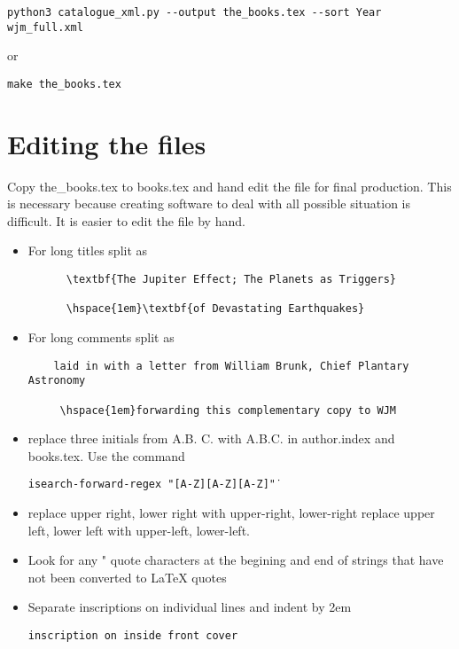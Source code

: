 \documentclass{article}
\begin{document}
\begin{verbatim}
python3 catalogue_xml.py --output the_books.tex --sort Year wjm_full.xml
\end{verbatim}
or
\begin{verbatim}
make the_books.tex
\end{verbatim}

\section{Editing the files}
Copy the\_books.tex to books.tex and hand edit the file for final
production. This is necessary because creating software to deal with
all possible situation is difficult.  It is easier to edit the file by
hand.

\begin{itemize}
\item For long titles split as
\begin{verbatim}
      \textbf{The Jupiter Effect; The Planets as Triggers}
 
      \hspace{1em}\textbf{of Devastating Earthquakes}
\end{verbatim}

\item For long comments split as
\begin{verbatim}
    laid in with a letter from William Brunk, Chief Plantary Astronomy

     \hspace{1em}forwarding this complementary copy to WJM
\end{verbatim}

 \item replace three initials from A.B. C. with A.B.C.
   in author.index and books.tex.  Use the command
   
   \texttt{isearch-forward-regex "[A-Z]\.[A-Z]\. [A-Z]\."}

 \item replace upper right, lower right with upper-right, lower-right
   replace upper left, lower left with upper-left, lower-left.

 \item Look for any " quote characters at the begining and end of strings
       that have not been converted to LaTeX quotes

     \item Separate inscriptions on individual lines and indent by 2em
\begin{verbatim}
inscription on inside front cover


\end{verbatim}
\end{itemize}
\end{document}
